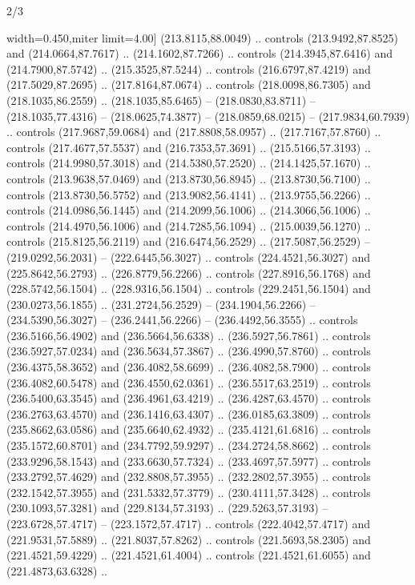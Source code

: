 \begin{flagdescription}{2/3}
\begin{scope}[xshift=0.5\flaglength,yshift=0.5\flagwidth,scale=\flagwidth/311.22]
\begin{scope}[y=0.8pt, x=0.8pt, yscale=-1,shift={(-291.77,-194.51)}]
  width=0.450\lw,miter limit=4.00] (213.8115,88.0049) .. controls
  (213.9492,87.8525) and (214.0664,87.7617) .. (214.1602,87.7266) .. controls
  (214.3945,87.6416) and (214.7900,87.5742) .. (215.3525,87.5244) .. controls
  (216.6797,87.4219) and (217.5029,87.2695) .. (217.8164,87.0674) .. controls
  (218.0098,86.7305) and (218.1035,86.2559) .. (218.1035,85.6465) --
  (218.0830,83.8711) -- (218.1035,77.4316) -- (218.0625,74.3877) --
  (218.0859,68.0215) -- (217.9834,60.7939) .. controls (217.9687,59.0684) and
  (217.8808,58.0957) .. (217.7167,57.8760) .. controls (217.4677,57.5537) and
  (216.7353,57.3691) .. (215.5166,57.3193) .. controls (214.9980,57.3018) and
  (214.5380,57.2520) .. (214.1425,57.1670) .. controls (213.9638,57.0469) and
  (213.8730,56.8945) .. (213.8730,56.7100) .. controls (213.8730,56.5752) and
  (213.9082,56.4141) .. (213.9755,56.2266) .. controls (214.0986,56.1445) and
  (214.2099,56.1006) .. (214.3066,56.1006) .. controls (214.4970,56.1006) and
  (214.7285,56.1094) .. (215.0039,56.1270) .. controls (215.8125,56.2119) and
  (216.6474,56.2529) .. (217.5087,56.2529) -- (219.0292,56.2031) --
  (222.6445,56.3027) .. controls (224.4521,56.3027) and (225.8642,56.2793) ..
  (226.8779,56.2266) .. controls (227.8916,56.1768) and (228.5742,56.1504) ..
  (228.9316,56.1504) .. controls (229.2451,56.1504) and (230.0273,56.1855) ..
  (231.2724,56.2529) -- (234.1904,56.2266) -- (234.5390,56.3027) --
  (236.2441,56.2266) -- (236.4492,56.3555) .. controls (236.5166,56.4902) and
  (236.5664,56.6338) .. (236.5927,56.7861) .. controls (236.5927,57.0234) and
  (236.5634,57.3867) .. (236.4990,57.8760) .. controls (236.4375,58.3652) and
  (236.4082,58.6699) .. (236.4082,58.7900) .. controls (236.4082,60.5478) and
  (236.4550,62.0361) .. (236.5517,63.2519) .. controls (236.5400,63.3545) and
  (236.4961,63.4219) .. (236.4287,63.4570) .. controls (236.2763,63.4570) and
  (236.1416,63.4307) .. (236.0185,63.3809) .. controls (235.8662,63.0586) and
  (235.6640,62.4932) .. (235.4121,61.6816) .. controls (235.1572,60.8701) and
  (234.7792,59.9297) .. (234.2724,58.8662) .. controls (233.9296,58.1543) and
  (233.6630,57.7324) .. (233.4697,57.5977) .. controls (233.2792,57.4629) and
  (232.8808,57.3955) .. (232.2802,57.3955) .. controls (232.1542,57.3955) and
  (231.5332,57.3779) .. (230.4111,57.3428) .. controls (230.1093,57.3281) and
  (229.8134,57.3193) .. (229.5263,57.3193) -- (223.6728,57.4717) --
  (223.1572,57.4717) .. controls (222.4042,57.4717) and (221.9531,57.5889) ..
  (221.8037,57.8262) .. controls (221.5693,58.2305) and (221.4521,59.4229) ..
  (221.4521,61.4004) .. controls (221.4521,61.6055) and (221.4873,63.6328) ..

\end{scope}
\end{scope}
\end{flagdescription}
